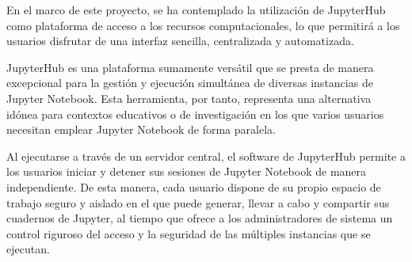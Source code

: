 \begin{spacing}{1.5}
  En el marco de este proyecto, se ha contemplado la utilización de
  JupyterHub como plataforma de acceso a los recursos computacionales, lo que
  permitirá a los usuarios disfrutar de una interfaz sencilla, centralizada y
  automatizada.

  JupyterHub es una plataforma sumamente versátil que se presta de manera
  excepcional para la gestión y ejecución simultánea de diversas instancias de
  Jupyter Notebook. Esta herramienta, por tanto, representa una alternativa
  idónea para contextos educativos o de investigación en los que varios usuarios
  necesitan emplear Jupyter Notebook de forma paralela.

  Al ejecutarse a través de un servidor central, el software de JupyterHub
  permite a los usuarios iniciar y detener sus sesiones de Jupyter Notebook de
  manera independiente. De esta manera, cada usuario dispone de su propio espacio
  de trabajo seguro y aislado en el que puede generar, llevar a cabo y compartir
  sus cuadernos de Jupyter, al tiempo que ofrece a los administradores de sistema
  un control riguroso del acceso y la seguridad de las múltiples instancias que
  se ejecutan.

  \mylinespacing
  \mylinespacing
  \begin{tightcenter}
  \end{tightcenter}
\end{spacing}